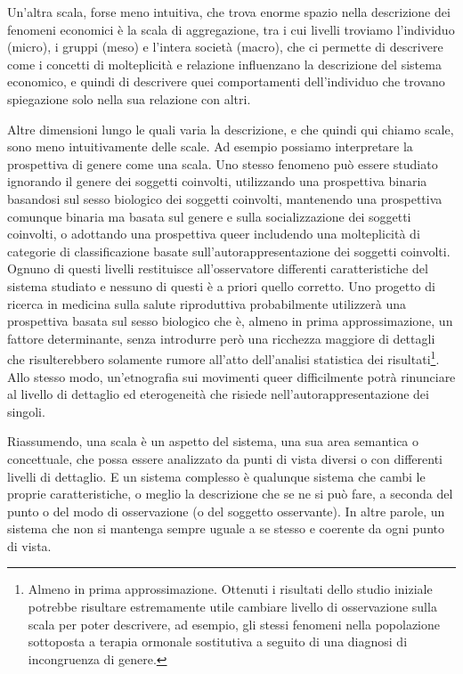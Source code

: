 \documentclass[a4paper, headings=standardclasses]{scrartcl}
\begin{document}
Un'altra scala, forse meno intuitiva, che trova enorme spazio nella descrizione dei fenomeni economici è la scala di aggregazione, tra i cui livelli troviamo l'individuo (micro), i gruppi (meso) e l'intera società (macro), che ci permette di descrivere come i concetti di molteplicità e relazione influenzano la descrizione del sistema economico, e quindi di descrivere quei comportamenti dell'individuo che trovano spiegazione solo nella sua relazione con altri.

Altre dimensioni lungo le quali varia la descrizione, e che quindi qui chiamo scale, sono meno intuitivamente delle scale.
Ad esempio possiamo interpretare la prospettiva di genere come una scala.
Uno stesso fenomeno può essere studiato ignorando il genere dei soggetti coinvolti, utilizzando una prospettiva binaria basandosi sul sesso biologico dei soggetti coinvolti, mantenendo una prospettiva comunque binaria ma basata sul genere e sulla socializzazione dei soggetti coinvolti, o adottando una prospettiva queer includendo una molteplicità di categorie di classificazione basate sull'autorappresentazione dei soggetti coinvolti.
Ognuno di questi livelli restituisce all'osservatore differenti caratteristiche del sistema studiato e nessuno di questi è a priori quello corretto.
Uno progetto di ricerca in medicina sulla salute riproduttiva probabilmente utilizzerà una prospettiva basata sul sesso biologico che è, almeno in prima approssimazione, un fattore determinante, senza introdurre però una ricchezza maggiore di dettagli che risulterebbero solamente rumore all'atto dell'analisi statistica dei risultati\footnote{Almeno in prima approssimazione. Ottenuti i risultati dello studio iniziale potrebbe risultare estremamente utile cambiare livello di osservazione sulla scala per poter descrivere, ad esempio, gli stessi fenomeni nella popolazione sottoposta a terapia ormonale sostitutiva a seguito di una diagnosi di incongruenza di genere.}.
Allo stesso modo, un'etnografia sui movimenti queer difficilmente potrà rinunciare al livello di dettaglio ed eterogeneità che risiede nell'autorappresentazione dei singoli.

Riassumendo, una scala è un aspetto del sistema, una sua area semantica o concettuale, che possa essere analizzato da punti di vista diversi o con differenti livelli di dettaglio.
E un sistema complesso è qualunque sistema che cambi le proprie caratteristiche, o meglio la descrizione che se ne si può fare, a seconda del punto o del modo di osservazione (o del soggetto osservante). In altre parole, un sistema che non si mantenga sempre uguale a se stesso e coerente da ogni punto di vista.
\end{document}

